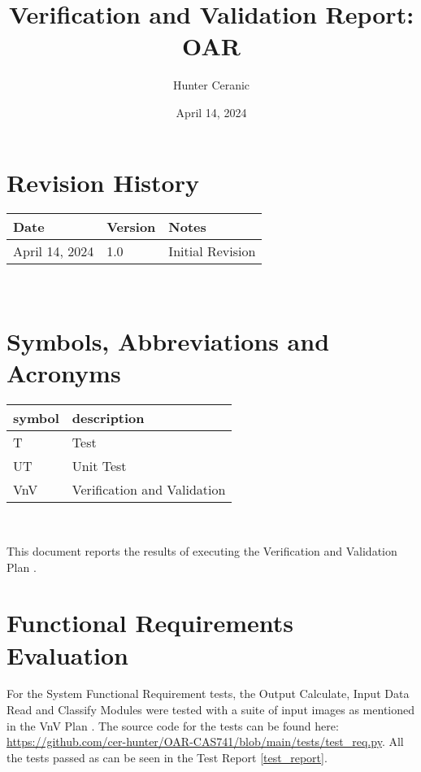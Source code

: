 \documentclass[12pt, titlepage]{article}
\begin{document}
\title{Verification and Validation Report: OAR} 
\author{Hunter Ceranic}
\date{April 14, 2024}
	
\maketitle


\section{Revision History}

\begin{tabularx}{\textwidth}{p{3cm}p{2cm}X}
\toprule {\bf Date} & {\bf Version} & {\bf Notes}\\
\midrule
April 14, 2024 & 1.0 & Initial Revision\\
\bottomrule
\end{tabularx}

~\newpage

\section{Symbols, Abbreviations and Acronyms}

\renewcommand{\arraystretch}{1.2}
\begin{tabular}{l l} 
  \toprule		
  \textbf{symbol} & \textbf{description}\\
  \midrule 
  T & Test\\
  UT & Unit Test\\
  VnV& Verification and Validation\\
  \bottomrule
\end{tabular}\\

\newpage

\tableofcontents

\newpage


This document reports the results of executing the Verification and Validation Plan \citep{VnVplan}.

\section{Functional Requirements Evaluation}

For the System Functional Requirement tests, the Output Calculate, Input Data Read and Classify Modules were tested
with a suite of input images as mentioned in the VnV Plan \citep{VnVplan}. The source code for the tests can be found here:
\url{https://github.com/cer-hunter/OAR-CAS741/blob/main/tests/test_req.py}.
All the tests passed as can be seen in the Test Report \ref{test_report}.\\
\end{document}
